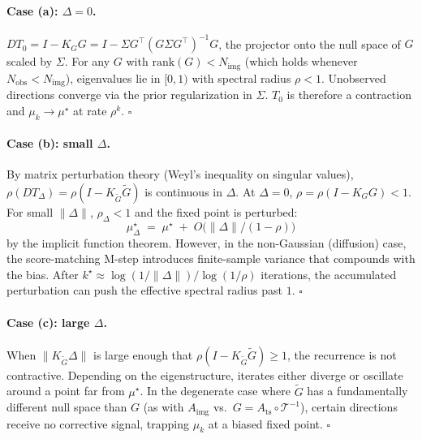 \documentclass{article}
\theoremstyle{plain}
\theoremstyle{definition}
\theoremstyle{remark}
\newcommand{\imgts}{\mathcal{T}^{-1}}
\newcommand{\Nimg}{N_{\mathrm{img}}}
\newcommand{\Nobs}{N_{\mathrm{obs}}}
\newcommand{\Ats}{A_{\mathrm{ts}}}
\newcommand{\Aimg}{A_{\mathrm{img}}}
\begin{document}
\paragraph{Case (a): $\Delta = 0$.}
$DT_0 = I - K_G G = I - \Sigma G^\top (G \Sigma G^\top)^{-1} G$, the projector onto the null space of $G$ scaled by $\Sigma$. For any $G$ with $\mathrm{rank}(G) < \Nimg$ (which holds whenever $\Nobs < \Nimg$), eigenvalues lie in $[0, 1)$ with spectral radius $\rho < 1$. Unobserved directions converge via the prior regularization in $\Sigma$. $T_0$ is therefore a contraction and $\mu_k \to \mu^\star$ at rate $\rho^k$. $\square$

\paragraph{Case (b): small $\Delta$.}
By matrix perturbation theory (Weyl's inequality on singular values), $\rho(DT_\Delta) = \rho(I - K_{\tilde{G}}\tilde{G})$ is continuous in $\Delta$. At $\Delta = 0$, $\rho = \rho(I - K_G G) < 1$. For small $\|\Delta\|$, $\rho_\Delta < 1$ and the fixed point is perturbed:
$$
\mu^\star_\Delta \;=\; \mu^\star \;+\; O\bigl(\|\Delta\|/(1-\rho)\bigr)
$$
by the implicit function theorem. However, in the non-Gaussian (diffusion) case, the score-matching M-step introduces finite-sample variance that compounds with the bias. After $k^\star \approx \log(1/\|\Delta\|)/\log(1/\rho)$ iterations, the accumulated perturbation can push the effective spectral radius past $1$. $\square$

\paragraph{Case (c): large $\Delta$.}
When $\|K_{\tilde{G}} \Delta\|$ is large enough that $\rho(I - K_{\tilde{G}} \tilde{G}) \geq 1$, the recurrence is not contractive. Depending on the eigenstructure, iterates either diverge or oscillate around a point far from $\mu^\star$. In the degenerate case where $\tilde{G}$ has a fundamentally different null space than $G$ (as with $\Aimg$ vs.\ $G = \Ats \circ \imgts$), certain directions receive no corrective signal, trapping $\mu_k$ at a biased fixed point. $\square$
\end{document}
